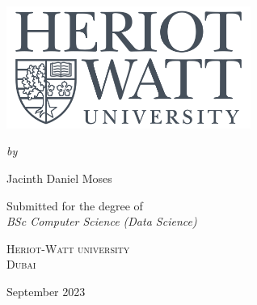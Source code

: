 \documentclass[12pt,a4paper]{report}
\author{Jacinth Daniel Moses}
\begin{document}
\begin{titlepage}
    \begin{center}
    \begin{spacing}{1.8}
    {\Large\bfseries\MakeUppercase{}}\\
    \end{spacing}
    
    \vspace{40pt}\par
    \includegraphics[width=8cm]{Figures/HWlOGO.png}
    \vspace{40pt}\par
    {\itshape\fontsize{15.5pt}{19pt}\selectfont by\\}\vspace{15pt}\par
    {\Large Jacinth Daniel Moses}\vspace{55pt}\par
    {\large Submitted for the degree of \\ \vspace{8pt} \Large\slshape{BSc Computer Science (Data Science)}\\}
    \vspace{35pt}\par
    {\scshape{} Heriot-Watt university\\ Dubai}
    \vspace{50pt}\par
    {\large September 2023}
    \end{center}
\end{titlepage}





\tableofcontents
\clearpage

\listoffigures
\listoftables
\clearpage


\end{document}

